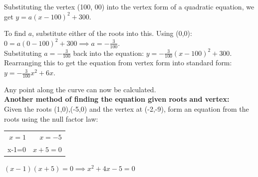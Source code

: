 \documentclass[12pt]{article}
\begin{document}
Substituting the vertex (100, 00) into the vertex form of a quadratic equation, we get $y=a(x-100)^2+300$.\\

\newpage

To find $a$, substitute either of the roots into this. Using (0,0): $0=a(0-100)^2+300 \implies a=-\frac{3}{100}$.\\

Substituting $a=-\frac{3}{100}$ back into the equation: $y=-\frac{3}{100}(x-100)^2+300$.\\

Rearranging this to get the equation from vertex form into standard form: $y=-\frac{3}{100}x^2+6x$.\\

\begin{center}
\end{center}

Any point along the curve can now be calculated.\\

\textbf{Another method of finding the equation given roots and vertex:}\\

Given the roots (1,0),(-5,0) and the vertex at (-2,-9), form an equation from the roots using the null factor law:
\begin{table}[h]
    \centering
    \begin{tabular}{r|r}
         $ x=1 $ & $   x=-5 $  \\
         x-1=0   & $ x+5=0$ \\
\end{tabular}
\end{table}

$(x-1)(x+5)=0 \implies x^2+4x-5=0$\\
\end{document}
